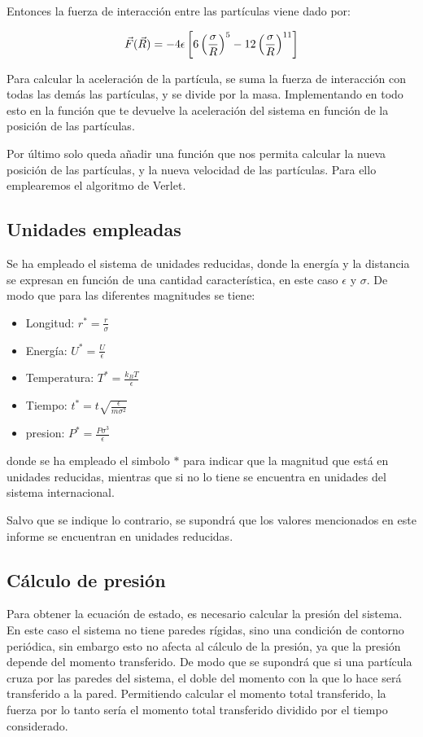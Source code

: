 \documentclass[11pt, twoside]{article} %
\begin{document}
Entonces la fuerza de interacción entre las partículas viene dado por:

\begin{equation}
    \vec{F}(\vec{R}) =  - 4\epsilon\left[6\left(\frac{\sigma}{R}\right)^{5}-
    12\left(\frac{\sigma}{R}\right)^{11}\right]
\end{equation}

Para calcular la aceleración de la partícula, se suma la fuerza de interacción con
todas las demás las partículas, y se divide por la masa. Implementando en todo esto en la función que te devuelve la aceleración del sistema
en función de la posición de las partículas.

Por último solo queda añadir una función que nos permita calcular la nueva posición
de las partículas, y la nueva velocidad de las partículas. Para ello emplearemos el
algoritmo de Verlet. 

\subsection{Unidades empleadas}

Se ha empleado el sistema de unidades reducidas, donde la energía y la distancia se 
expresan en función de una cantidad característica, en este caso $\epsilon$ y $\sigma$. 
De modo que para las diferentes magnitudes se tiene:
\begin{itemize}
    \item Longitud: $r^* = \frac{r}{\sigma}$
    \item Energía: $U^* = \frac{U}{\epsilon}$
    \item Temperatura: $T^* = \frac{k_B T}{\epsilon}$
    \item Tiempo: $t^* = t \sqrt{\frac{\epsilon}{m\sigma^2}}$
    \item presion: $P^* = \frac{P\sigma^3}{\epsilon}$
\end{itemize}
donde se ha empleado el simbolo $*$ para indicar que la magnitud que está en unidades 
reducidas, mientras que si no lo tiene se encuentra en unidades del sistema 
internacional. 

Salvo que se indique lo contrario, se supondrá que los valores mencionados en este
informe se encuentran en unidades reducidas.

\subsection{Cálculo de presión}

Para obtener la ecuación de estado, es necesario calcular la presión del sistema. 
En este caso el sistema no tiene paredes rígidas, sino una condición de contorno 
periódica, sin embargo esto no afecta al cálculo de la presión, ya que la presión 
depende del momento transferido. De modo que se supondrá que si una partícula cruza
por las paredes del sistema, el doble del momento con la que lo hace será transferido 
a la pared. Permitiendo calcular el momento total transferido, la fuerza por lo tanto
sería el momento total transferido dividido por el tiempo considerado. 
\end{document}
